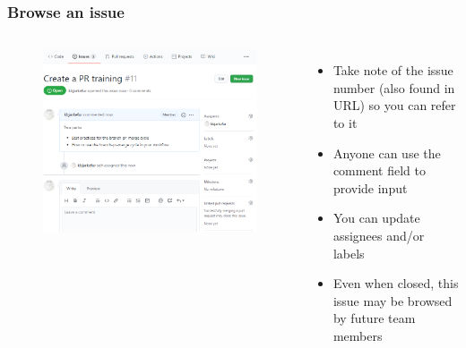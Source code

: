 \documentclass[aspectratio=169]{beamer} %
\begin{document}
\begin{frame}
	\frametitle{Browse an issue}
	\begin{columns}[c]
		
		\vspace{-.5cm}
		\begin{figure}
			\centering
			\includegraphics[width=\textwidth]{./img/create-issue-2.png}
		\end{figure}
		
		
		\begin{itemize}
			\setlength\itemsep{1em}
			\item Take note of the issue number (also found in URL) so you can refer to it
			\item Anyone can use the comment field to provide input
			\item You can update assignees and/or labels
			\item Even when closed, this issue may be browsed by future team members
		\end{itemize}
		
	\end{columns}	
\end{frame}
\end{document}
